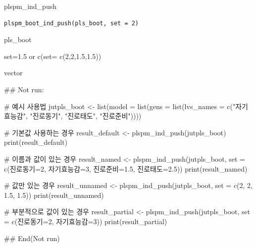 \documentclass[a4paper]{book}
\begin{document}
%
\begin{Description}
plspm\_ind\_push
\end{Description}
%
\begin{Usage}
\begin{verbatim}
plspm_boot_ind_push(pls_boot, set = 2)
\end{verbatim}
\end{Usage}
%
\begin{Arguments}
\begin{ldescription}
\item[\code{pls\_boot}] pls\_boot

\item[\code{set}] set=1.5 or c(set= c(2,2,1.5,1.5))
\end{ldescription}
\end{Arguments}
%
\begin{Value}
vector
\end{Value}
%
\begin{Examples}
\begin{ExampleCode}

\#\# Not run: 

# 예시 사용법
jutpls_boot <- list(model = list(gens = list(lvs_names = c("자기효능감", "진로동기", "진로태도", "진로준비"))))

# 기본값 사용하는 경우
result_default <- plspm_ind_push(jutpls_boot)
print(result_default)

# 이름과 값이 있는 경우
result_named <- plspm_ind_push(jutpls_boot, set = c(진로동기=2, 자기효능감=3, 진로준비=1.5, 진로태도=2.5))
print(result_named)

# 값만 있는 경우
result_unnamed <- plspm_ind_push(jutpls_boot, set = c(2, 2, 1.5, 1.5))
print(result_unnamed)

# 부분적으로 값이 있는 경우
result_partial <- plspm_ind_push(jutpls_boot, set = c(진로동기=2, 자기효능감=3))
print(result_partial)


## End(Not run)



\end{ExampleCode}
\end{Examples}
\end{document}

